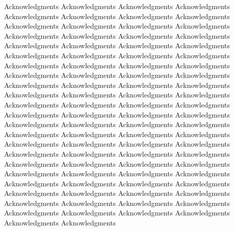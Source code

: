 Acknowledgments Acknowledgments Acknowledgments Acknowledgments Acknowledgments Acknowledgments Acknowledgments Acknowledgments Acknowledgments Acknowledgments Acknowledgments Acknowledgments Acknowledgments Acknowledgments Acknowledgments Acknowledgments Acknowledgments Acknowledgments Acknowledgments Acknowledgments Acknowledgments Acknowledgments Acknowledgments Acknowledgments Acknowledgments Acknowledgments Acknowledgments Acknowledgments Acknowledgments Acknowledgments Acknowledgments Acknowledgments Acknowledgments Acknowledgments Acknowledgments Acknowledgments Acknowledgments Acknowledgments Acknowledgments Acknowledgments Acknowledgments Acknowledgments Acknowledgments Acknowledgments Acknowledgments Acknowledgments Acknowledgments Acknowledgments Acknowledgments Acknowledgments Acknowledgments Acknowledgments Acknowledgments Acknowledgments Acknowledgments Acknowledgments Acknowledgments Acknowledgments Acknowledgments Acknowledgments Acknowledgments Acknowledgments Acknowledgments Acknowledgments Acknowledgments Acknowledgments Acknowledgments Acknowledgments Acknowledgments Acknowledgments Acknowledgments Acknowledgments Acknowledgments Acknowledgments Acknowledgments Acknowledgments Acknowledgments Acknowledgments Acknowledgments Acknowledgments Acknowledgments Acknowledgments Acknowledgments Acknowledgments Acknowledgments Acknowledgments Acknowledgments Acknowledgments Acknowledgments Acknowledgments 

\cleardoublepage{}

